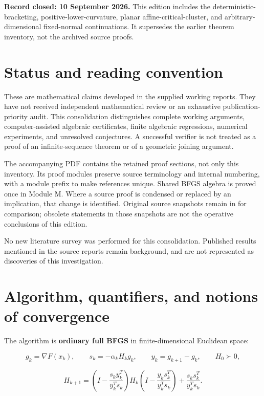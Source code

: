 \textbf{Record closed: 10 September 2026.} This edition includes the deterministic-bracketing, positive-lower-curvature, planar affine-critical-cluster, and arbitrary-dimensional fixed-normal continuations. It supersedes the earlier theorem inventory, not the archived source proofs.

\section*{Status and reading convention}\label{status-and-reading-convention}

These are mathematical claims developed in the supplied working reports. They have not received independent mathematical review or an exhaustive publication-priority audit. This consolidation distinguishes complete working arguments, computer-assisted algebraic certificates, finite algebraic regressions, numerical experiments, and unresolved conjectures. A successful verifier is not treated as a proof of an infinite-sequence theorem or of a geometric joining argument.

The accompanying PDF contains the retained proof sections, not only this inventory. Its proof modules preserve source terminology and internal numbering, with a module prefix to make references unique. Shared BFGS algebra is proved once in Module M. Where a source proof is condensed or replaced by an implication, that change is identified. Original source snapshots remain in  for comparison; obsolete statements in those snapshots are not the operative conclusions of this edition.

No new literature survey was performed for this consolidation. Published results mentioned in the source reports remain background, and are not represented as discoveries of this investigation.

\section{Algorithm, quantifiers, and notions of convergence}\label{algorithm-quantifiers-and-notions-of-convergence}

The algorithm is \textbf{ordinary full BFGS} in finite-dimensional Euclidean space:

\[
 g_k=\nabla F(x_k),\qquad s_k=-\alpha_kH_kg_k,\qquad
 y_k=g_{k+1}-g_k,\qquad H_0\succ0,
\]

\[
 H_{k+1}=\left(I-\frac{s_ky_k^T}{y_k^Ts_k}\right)H_k
 \left(I-\frac{y_ks_k^T}{y_k^Ts_k}\right)
 +\frac{s_ks_k^T}{y_k^Ts_k}.
\]

